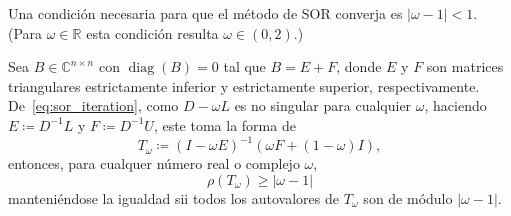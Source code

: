 \begin{frame}

	\begin{theorem}[Kahan]
		Una condición necesaria para que el \alert{método de SOR} converja
		es $\left|\omega-1\right|<1$.
		(Para $\omega\in\mathbb{R}$ esta condición resulta
		$\omega\in\left(0,2\right)$.)
	\end{theorem}



	\begin{theorem}
		Sea $B\in\mathbb{C}^{n\times n}$ con
		$\operatorname{diag}\left(B\right)=0$ tal que $B=E+F$, donde
		$E$ y $F$ son matrices triangulares
		estrictamente inferior y estrictamente superior, respectivamente.
		De~\eqref{eq:sor_iteration}, como $D-\omega L$ es no singular
		para cualquier $\omega$, haciendo $E\coloneqq D^{-1}L$ y
		$F\coloneqq D^{-1}U$, este toma la forma de
		\begin{equation*}
			T_{\omega}\coloneqq
			{\left(I-\omega E\right)}^{-1}\left(\omega F+(1-\omega)I\right),
		\end{equation*}
		entonces, para cualquer número real o complejo $\omega$,
		\begin{equation*}
			\rho\left(T_{\omega}\right)\geq\left|\omega-1\right|
		\end{equation*}
		manteniéndose la igualdad sii todos los autovalores de
		$T_{\omega}$ son de módulo $\left|\omega-1\right|$.
	\end{theorem}


\end{frame}
